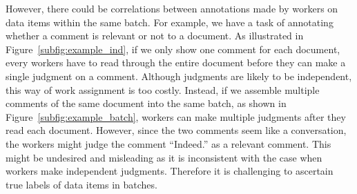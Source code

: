 However, there could be correlations between annotations made by workers on data items within the same batch.
For example, we have a task of annotating whether a comment is relevant or not to a document.
As illustrated in Figure~\ref{subfig:example_ind}, if we only show one comment for each document,
every workers have to read through the entire document before they can make a single judgment on a comment.
Although judgments are likely to be independent, this way of work assignment is too costly.
Instead, if we assemble multiple comments of the same document into the same batch, as shown in Figure~\ref{subfig:example_batch},
workers can make multiple judgments after they read each document.
However, since the two comments seem like a conversation,
the workers might judge the comment ``Indeed.'' as a relevant comment.
This might be undesired and misleading as it is inconsistent with the case when workers make independent judgments.
Therefore it is challenging to ascertain true labels of data items in batches.





